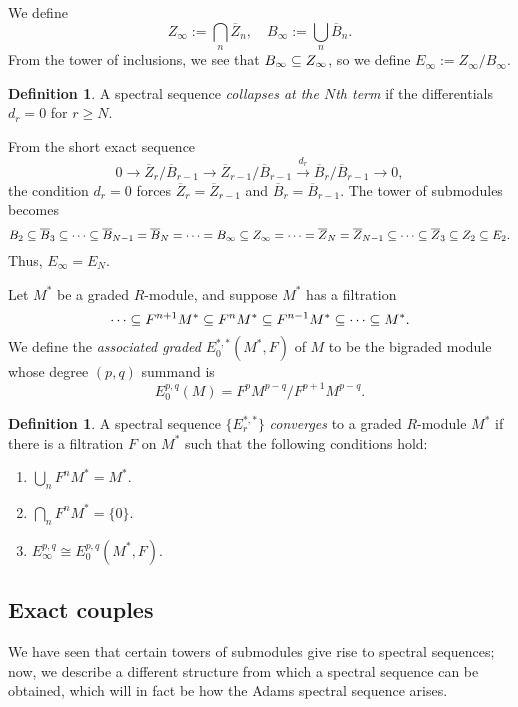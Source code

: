 \documentclass[11pt, titlepage]{article} %
\def\subq{\ensuremath\subseteq}
\numberwithin{equation}{subsection}
\theoremstyle{plain}
\theoremstyle{definition}
\newtheorem{definition}[theorem]{Definition}
\begin{document}
We define 
\[Z_\infty:= \bigcap_n \overline{Z}_n, \quad B_\infty:=\bigcup_n \overline{B}_n.\]
From the tower of inclusions, we see that \(B_\infty\subq Z_\infty\), so we define \(E_\infty:=Z_\infty/B_\infty\). 

\begin{definition}
A spectral sequence \textit{collapses at the \(N\)th term} if the differentials \(d_r=0\) for \(r\geq N\). 
\end{definition}

From the short exact sequence 
\[0 \to \overline Z_{r}/\overline B_{r-1}\to \overline Z_{r-1}/\overline B_{r-1} \xrightarrow{d_{r}} \overline B_{r}/\overline{B}_{r-1}\to 0,\]
the condition \(d_r=0\) forces  \(\overline{Z}_r=\overline{Z}_{r-1}\) and \(\overline{B}_r=\overline{B}_{r-1}\). The tower of submodules becomes
\[B_2\subq \overline B_3\subq \cdots \subq \overline B_{N-1}=\overline B_N= \cdots=B_\infty \subq Z_\infty= \cdots = \overline Z_N=\overline Z_{N-1}\subq \cdots \subq \overline Z_3\subq Z_2\subq E_2.\]
Thus, \(E_\infty=E_N\). 

Let \(M^*\) be a graded \(R\)-module, and suppose \(M^*\) has a filtration
\[\cdots \subq F^{n+1}M^*\subq F^nM^* \subq F^{n-1}M^*\subq \cdots \subq M^*.\]
We define the \textit{associated graded} \(E^{*,*}_0(M^*, F)\) of \(M\) to be the bigraded module whose degree \((p,q)\) summand is
\[E^{p,q}_0(M)= F^pM^{p-q}/F^{p+1}M^{p-q}.\]

\begin{definition}\label{2504291808}
A spectral sequence \(\{E_r^{*,*}\}\) \textit{converges} to a graded \(R\)-module \(M^*\) if there is a filtration \(F\) on \(M^*\) such that the following conditions hold:
\begin{enumerate}
\item \(\bigcup_n F^nM^* = M^*\).
\item \(\bigcap_n F^nM^*=\{0\}\).
\item \(E_\infty^{p,q}\cong E^{p,q}_0(M^*, F)\).
\end{enumerate}
\end{definition}

\subsection{Exact couples}\label{2503301333}

We have seen that certain towers of submodules give rise to spectral sequences; now, we describe a different structure from which a spectral sequence can be obtained, which will in fact be how the Adams spectral sequence arises.
\end{document}
